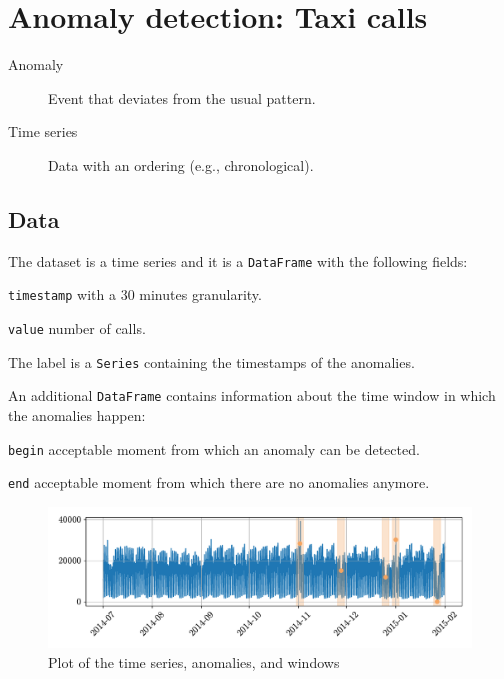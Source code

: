 \chapter{Anomaly detection: Taxi calls}

\begin{description}
    \item[Anomaly] 
        Event that deviates from the usual pattern.

    \item[Time series] 
        Data with an ordering (e.g., chronological).
\end{description}



\section{Data}

The dataset is a time series and it is a \texttt{DataFrame} with the following fields:
\begin{descriptionlist}
    \item[\texttt{timestamp}] with a 30 minutes granularity.
    \item[\texttt{value}] number of calls.
\end{descriptionlist}

The label is a \texttt{Series} containing the timestamps of the anomalies.

An additional \texttt{DataFrame} contains information about the time window in which the anomalies happen:
\begin{descriptionlist}
    \item[\texttt{begin}] acceptable moment from which an anomaly can be detected.
    \item[\texttt{end}] acceptable moment from which there are no anomalies anymore.
\end{descriptionlist}

\begin{figure}[H]
    \centering
    \includegraphics[width=0.7\linewidth]{./img/_ad_taxi_data.pdf}
    \caption{Plot of the time series, anomalies, and windows}
\end{figure}



